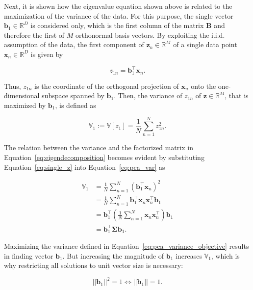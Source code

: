 \documentclass[../../../main.tex]{subfiles}
\begin{document}
Next, it is shown how the eigenvalue equation shown above is related to the maximization of the variance of the data. For this purpose, the single vector $\bm{b}_1 \in \mathbb{R}^D$ is considered only, which is the first column of the matrix $\bm{B}$ and therefore the first of $M$ orthonormal basis vectors. By exploiting the i.i.d. assumption of the data, the first component of $\bm{z}_n \in \mathbb{R}^M$ of a single data point $\bm{x}_n \in \mathbb{R}^D$ is given by

\begin{equation}\label{eq:single_z}
    z_{1n} = \bm{b}_1^\top\bm{x}_n.
\end{equation}

Thus, $z_{1n}$ is the coordinate of the orthogonal projection of $\bm{x}_n$ onto the one-dimensional subspace spanned by $\bm{b}_1$. Then, the variance of $z_{1n}$ of $\bm{z} \in \mathbb{R}^M$, that is maximized by $\bm{b}_1$, is defined as

\begin{equation}\label{eq:pca_var}
    \mathbb{V}_1:= \mathbb{V}[z_1] = \frac{1}{N}\sum_{n=1}^N z_{1n}^2.
\end{equation}

The relation between the variance and the factorized matrix in Equation~\ref{eq:eigendecomposition} becomes evident by substituting Equation~\ref{eq:single_z} into Equation~\ref{eq:pca_var} as

\begin{equation}\label{eq:pca_variance_objective}
    \begin{aligned}
        \mathbb{V}_1 &= \frac{1}{N}\sum\limits^N_{n=1}(\bm{b}_1^\top\bm{x}_n)^2 \\
        &= \frac{1}{N}\sum\limits^N_{n=1} \bm{b}_1^\top \bm{x}_n \bm{x}_n^\top \bm{b}_1 \\
        &= \bm{b}_1^\top(\frac{1}{N}\sum\limits^N_{n=1} \bm{x}_n \bm{x}_n^\top ) \bm{b}_1 \\
        &= \bm{b}_1^\top \bm{\Sigma} \bm{b}_1.
    \end{aligned}
\end{equation}

Maximizing the variance defined in Equation~\ref{eq:pca_variance_objective} results in finding vector $\bm{b}_1$. But increasing the magnitude of $\bm{b}_1$ increases $\mathbb{V}_1$, which is why restricting all solutions to unit vector size is necessary:

\begin{equation*}
    || \bm{b}_1 || ^2 = 1 \Leftrightarrow || \bm{b}_1 || = 1.
\end{equation*}
\end{document}
